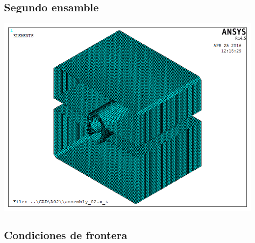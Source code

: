 


\subsection{Segundo ensamble}

\begin{center}
\includegraphics[scale=0.6]{src/ch3/mesh_assembly_02.png}
\label{fig:mesh_assembly02}
\end{center}





\subsection{Condiciones de frontera}

